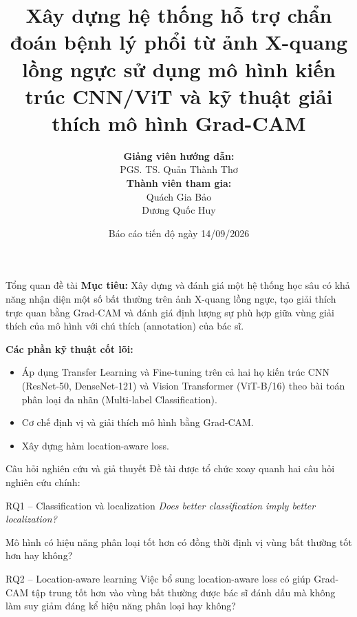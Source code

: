 \documentclass[10pt]{beamer}
\title[Báo cáo tiến độ ĐATH]{Xây dựng hệ thống hỗ trợ chẩn đoán bệnh lý phổi từ ảnh X-quang lồng ngực sử dụng mô hình kiến trúc CNN/ViT và kỹ thuật giải thích mô hình Grad-CAM}
\author[Bảo, Huy]{
    \textbf{Giảng viên hướng dẫn:}\\
    \vspace{0.1cm}
    PGS. TS. Quản Thành Thơ\\
    \vspace{0.5cm}
    \textbf{Thành viên tham gia:}\\
    \vspace{0.1cm}
    Quách Gia Bảo\\
    Dương Quốc Huy\\
}
\date{Báo cáo tiến độ ngày 14/09/2026}
\begin{document}
\begin{frame}
    \titlepage
\end{frame}

\begin{frame}{Tổng quan đề tài}
    \textbf{Mục tiêu:} Xây dựng và đánh giá một hệ thống học sâu có khả năng nhận diện một số bất thường trên ảnh X-quang lồng ngực, tạo giải thích trực quan bằng Grad-CAM và đánh giá định lượng sự phù hợp giữa vùng giải thích của mô hình với chú thích (annotation) của bác sĩ.
    \vspace{0.3cm}

    \textbf{Các phần kỹ thuật cốt lõi:}
    \begin{itemize}
        \item Áp dụng Transfer Learning và Fine-tuning trên cả hai họ kiến trúc CNN (ResNet-50, DenseNet-121) và Vision Transformer (ViT-B/16) theo bài toán phân loại đa nhãn (Multi-label Classification).
        \item Cơ chế định vị và giải thích mô hình bằng Grad-CAM.
        \item Xây dựng hàm location-aware loss.
    \end{itemize}
\end{frame}

\begin{frame}{Câu hỏi nghiên cứu và giả thuyết}
    Đề tài được tổ chức xoay quanh hai câu hỏi nghiên cứu chính:

    \begin{block}{RQ1 -- Classification và localization}
        \textit{Does better classification imply better localization?}

        \medskip
        Mô hình có hiệu năng phân loại tốt hơn có đồng thời định vị vùng bất thường tốt hơn hay không?
    \end{block}

    \begin{block}{RQ2 -- Location-aware learning}
        Việc bổ sung location-aware loss có giúp Grad-CAM tập trung tốt hơn vào vùng bất thường được bác sĩ đánh dấu mà không làm suy giảm đáng kể hiệu năng phân loại hay không?
    \end{block}
\end{frame}
\end{document}
